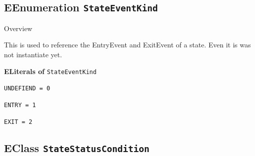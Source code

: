 \subsection{EEnumeration \bfseries \texttt{StateEventKind}\normalfont}
\label{cls:dependencylanguage::StateEventKind} 

	\begin{longdescription}
		\item[Overview] 		
				

	

		This is used to reference the EntryEvent and ExitEvent of a state.
Even it is was not instantiate yet.		
	
		\item[\textbf{ELiterals of} \texttt{StateEventKind}] ~
		\begin{longdescription}
			
\item[\texttt{UNDEFIEND = 0}] ~
\nopagebreak

\item[\texttt{ENTRY = 1}] ~
\nopagebreak

\item[\texttt{EXIT = 2}] ~
\nopagebreak
		\end{longdescription}
	\end{longdescription}
	
	

\subsection{EClass \bfseries \texttt{StateStatusCondition}\normalfont}
\label{cls:dependencylanguage::StateStatusCondition} 
	
